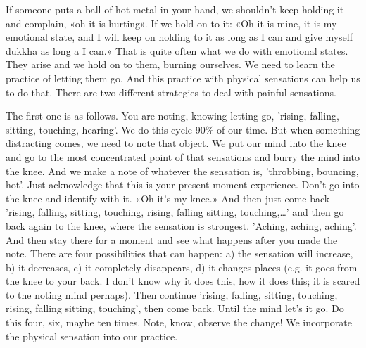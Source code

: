 \documentclass[letterpaper,10pt,english]{sphinxmanual}
\begin{document}
\sphinxAtStartPar
If someone puts a ball of hot metal in your hand, we shouldn’t keep
holding it and complain, «oh it is hurting». If we hold on to it: «Oh it is mine,
it is my emotional state, and I will keep on holding to it as long as I can and
give myself dukkha as long a I can.» That is quite often what we do with
emotional states. They arise and we hold on to them, burning ourselves. We
  need to learn the practice of letting them go. And this practice with physical
sensations can help us to do that. There are two different strategies to deal
with painful sensations.

\sphinxAtStartPar
The first one is as follows. You are noting, knowing letting go, ’rising,
falling, sitting, touching, hearing’. We do this cycle 90\% of our time. But
when something distracting comes, we need to note that object. We put our
mind  into  the  knee  and  go  to  the  most  concentrated  point  of  that  sensations and burry the mind into the knee. And we make a note of whatever the
sensation is, ’throbbing, bouncing, hot’. Just acknowledge that this is your
present moment experience. Don’t go into the knee and identify with it. «Oh
it’s  my  knee.» And  then  just  come  back  ’rising,  falling,  sitting,  touching,
rising, falling sitting, touching,…’ and then go back again to the knee, where
the sensation is strongest. ’Aching, aching, aching’. And then stay there for
a  moment  and  see  what  happens  after  you  made  the  note.  There  are  four
possibilities that can happen: a) the sensation will increase, b) it decreases,
c) it completely disappears, d) it changes places (e.g. it goes from the knee
to your back. I don’t know why it does this, how it does this; it is scared to
the noting mind perhaps). Then continue ’rising, falling, sitting, touching,
rising, falling sitting, touching’, then come back. Until the mind let’s it go.
Do  this  four,  six,  maybe  ten  times.  Note,  know,  observe  the  change!  We
incorporate the physical sensation into our practice.
\end{document}
